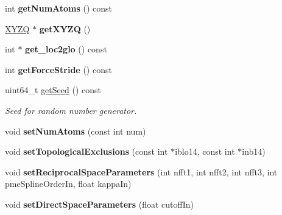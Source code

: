 \begin{DoxyCompactItemize}
\hypertarget{classCudaSimulationContext_a2597d60c9f2eba81cbecc27430eb8af8}{}\label{classCudaSimulationContext_a2597d60c9f2eba81cbecc27430eb8af8} 
int {\bfseries get\+Num\+Atoms} () const
\item 
\hypertarget{classCudaSimulationContext_adebb325f8c0301463c0c711d9d27aede}{}\label{classCudaSimulationContext_adebb325f8c0301463c0c711d9d27aede} 
\hyperlink{classXYZQ}{X\+Y\+ZQ} $\ast$ {\bfseries get\+X\+Y\+ZQ} ()
\item 
\hypertarget{classCudaSimulationContext_a647a64eaf74697553611136883c87231}{}\label{classCudaSimulationContext_a647a64eaf74697553611136883c87231} 
int $\ast$ {\bfseries get\+\_\+loc2glo} () const
\item 
\hypertarget{classCudaSimulationContext_ab50cb50573965c0eb1d5cb721a469dd5}{}\label{classCudaSimulationContext_ab50cb50573965c0eb1d5cb721a469dd5} 
int {\bfseries get\+Force\+Stride} () const
\item 
uint64\+\_\+t \hyperlink{classCudaSimulationContext_ae52294d7e991824018cf9c9cb543ca1e}{get\+Seed} () const
\begin{DoxyCompactList}\small\item\em Seed for random number generator. \end{DoxyCompactList}\item 
\hypertarget{classCudaSimulationContext_aa4c1a2889174fa13b12cd1c5d51249ac}{}\label{classCudaSimulationContext_aa4c1a2889174fa13b12cd1c5d51249ac} 
void {\bfseries set\+Num\+Atoms} (const int num)
\item 
\hypertarget{classCudaSimulationContext_ace92f9f313550320d6e556f7d3545636}{}\label{classCudaSimulationContext_ace92f9f313550320d6e556f7d3545636} 
void {\bfseries set\+Topological\+Exclusions} (const int $\ast$iblo14, const int $\ast$inb14)
\item 
\hypertarget{classCudaSimulationContext_a248b72f769d347724512364558425d26}{}\label{classCudaSimulationContext_a248b72f769d347724512364558425d26} 
void {\bfseries set\+Reciprocal\+Space\+Parameters} (int nfft1, int nfft2, int nfft3, int pme\+Spline\+Order\+In, float kappa\+In)
\item 
\hypertarget{classCudaSimulationContext_a6a13d50ec17f5a8e286ea4d0694ddfdd}{}\label{classCudaSimulationContext_a6a13d50ec17f5a8e286ea4d0694ddfdd} 
void {\bfseries set\+Direct\+Space\+Parameters} (float cutoff\+In)
\item 
\hypertarget{classCudaSimulationContext_ae12349b0d0d27f4abefdde6e0b2e2e5a}{}\label{classCudaSimulationContext_ae12349b0d0d27f4abefdde6e0b2e2e5a} 

\end{DoxyCompactItemize}
